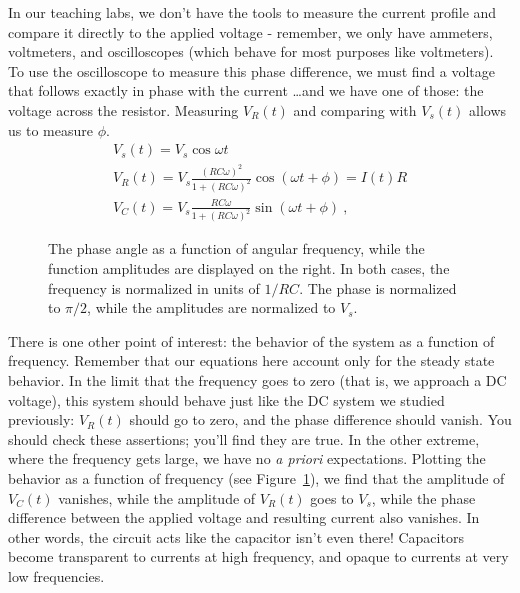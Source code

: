 \documentclass[12pt]{article}
\begin{document}
In our teaching labs, we don't have the tools to measure the current
profile and compare it directly to the applied voltage - remember, we
only have ammeters, voltmeters, and oscilloscopes (which behave for
most purposes like voltmeters).  To use the oscilloscope to measure
this phase difference, we must find a voltage that follows exactly in
phase with the current \ldots and we have one of those: the voltage
across the resistor.  Measuring $V_R(t)$ and comparing with $V_s(t)$
allows us to measure $\phi$.
\begin{gather*}
  V_s(t) = V_s \cos \omega t\\
  V_R(t) = V_s \frac{(RC\omega)^2}{1+(RC\omega)^2} \cos( \omega t
  + \phi) = I(t) R\\
  V_C(t) = V_s \frac{RC\omega}{1+(RC\omega)^2} \sin( \omega t + \phi)\ ,
\end{gather*}

\begin{figure}
  \centering
   \qquad
  \caption{The phase angle as a function of angular frequency, while
    the function amplitudes are displayed on the right.  In both
    cases, the frequency is normalized in units of $1/RC$.  The phase
    is normalized to $\pi/2$, while the amplitudes are normalized to
    $V_s$.}
  \label{fig:frequency}
\end{figure}
There is one other point of interest: the behavior of the system as a
function of frequency.  Remember that our equations here account only
for the steady state behavior.  In the limit that the frequency goes
to zero (that is, we approach a DC voltage), this system should behave
just like the DC system we studied previously: $V_R(t)$ should go to
zero, and the phase difference should vanish.  You should check these
assertions; you'll find they are true.  In the other extreme, where
the frequency gets large, we have no \textit{a priori} expectations.
Plotting the behavior as a function of frequency (see
Figure~\ref{fig:frequency}), we find that the amplitude of $V_C(t)$
vanishes, while the amplitude of $V_R(t)$ goes to $V_s$, while the
phase difference between the applied voltage and resulting current
also vanishes.  In other words, the circuit acts like the capacitor
isn't even there!  Capacitors become transparent to currents at high
frequency, and opaque to currents at very low frequencies.
\end{document}
